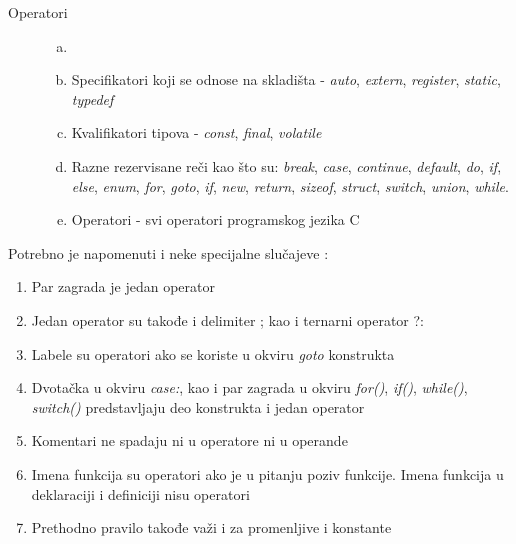 \documentclass[12pt,oneside]{memoir}
\begin{document}
\begin{description}
\begin{description}
\item[Operatori]
	\begin{enumerate}[(a)]
		\item[]
		\item Specifikatori koji se odnose na skladišta - \textit{auto}, \textit{extern}, \textit{register}, \textit{static}, \textit{typedef}
		\item Kvalifikatori tipova - \textit{const}, \textit{final}, \textit{volatile}
		\item Razne rezervisane reči kao što su: \textit{break}, \textit{case}, \textit{continue}, \textit{default}, \textit{do}, \textit{if}, \textit{else}, \textit{enum}, \textit{for}, \textit{goto}, \textit{if}, \textit{new}, \textit{return}, \textit{sizeof}, \textit{struct}, \textit{switch}, \textit{union}, \textit{while}. 
		\item Operatori - svi operatori programskog jezika C
	\end{enumerate}
\end{description}
Potrebno je napomenuti i neke specijalne slučajeve \cite{halstead}: 
\begin{enumerate}
	\item Par zagrada je jedan operator
	\item Jedan operator su takođe i delimiter ; kao i ternarni operator ?:
	\item Labele su operatori ako se koriste u okviru \textit{goto} konstrukta
	\item Dvotačka u okviru \textit{case:}, kao i par zagrada u okviru \textit{for()}, \textit{if()}, \textit{while()}, \textit{switch()} predstavljaju deo konstrukta i jedan operator 
	\item Komentari ne spadaju ni u operatore ni u operande
	\item Imena funkcija su operatori ako je u pitanju poziv funkcije. Imena funkcija u deklaraciji i definiciji nisu operatori
	\item Prethodno pravilo takođe važi i za promenljive i konstante
\end{enumerate}


\end{description}
\end{document}
